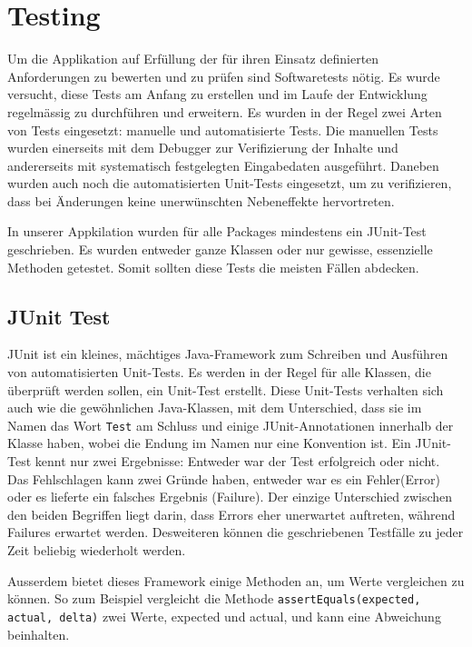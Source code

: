 \section{Testing}
Um die Applikation auf Erfüllung der für ihren Einsatz definierten
Anforderungen zu bewerten und zu prüfen sind Softwaretests nötig. Es wurde
versucht, diese Tests am Anfang zu erstellen und im Laufe der Entwicklung
regelmässig zu durchführen und erweitern. Es wurden in der Regel zwei Arten
von Tests eingesetzt: manuelle und automatisierte Tests. Die manuellen Tests
wurden einerseits mit dem Debugger zur Verifizierung der Inhalte und
andererseits mit systematisch festgelegten Eingabedaten ausgeführt. Daneben
wurden auch noch die automatisierten Unit-Tests eingesetzt, um zu
verifizieren, dass bei Änderungen keine unerwünschten Nebeneffekte
hervortreten. 

In unserer Appkilation wurden für alle Packages mindestens ein JUnit-Test
geschrieben. Es wurden entweder ganze Klassen oder nur gewisse, essenzielle
Methoden getestet. Somit sollten diese Tests die meisten Fällen abdecken. 

\subsection{JUnit Test}
JUnit\cite{junitTest} ist ein kleines, mächtiges Java-Framework zum Schreiben und Ausführen
von automatisierten Unit-Tests. Es werden in der Regel für alle Klassen, die
überprüft werden sollen, ein Unit-Test erstellt. Diese Unit-Tests verhalten
sich auch wie die gewöhnlichen Java-Klassen, mit dem Unterschied, dass sie im
Namen das Wort \texttt{Test} am Schluss und einige JUnit-Annotationen innerhalb der
Klasse haben, wobei die Endung im Namen nur eine Konvention ist. Ein
JUnit-Test kennt nur zwei Ergebnisse: Entweder war der Test erfolgreich oder
nicht. Das Fehlschlagen kann zwei Gründe haben, entweder war es ein
Fehler(Error) oder es lieferte ein falsches Ergebnis (Failure). Der einzige
Unterschied zwischen den beiden Begriffen liegt darin, dass Errors eher
unerwartet auftreten, während Failures erwartet werden. Desweiteren können die
geschriebenen Testfälle zu jeder Zeit beliebig wiederholt werden. 

Ausserdem bietet dieses Framework einige Methoden an, um Werte vergleichen zu
können. So zum Beispiel vergleicht die Methode \texttt{assertEquals(expected, actual,
delta)} zwei Werte, expected und actual, und kann eine Abweichung beinhalten. 

